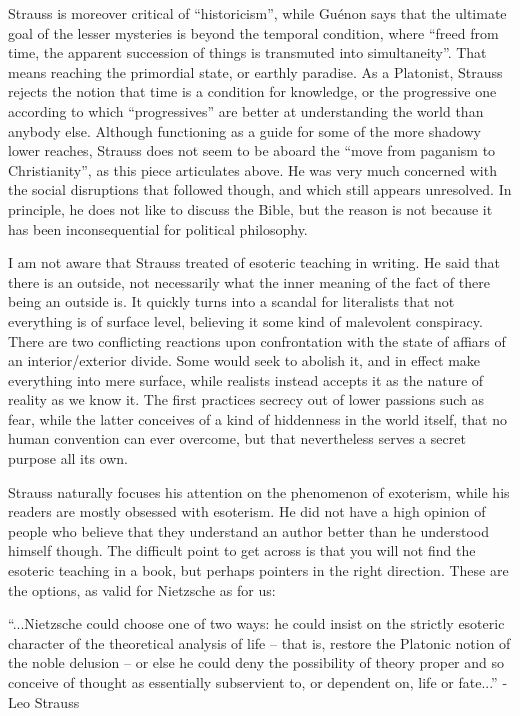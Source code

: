 \begin{footnotesize}
\begin{sffamily}
Strauss is moreover critical of ``historicism'', while Guénon says that the ultimate goal of the lesser mysteries is beyond the temporal condition, where ``freed from time, the apparent succession of things is transmuted into simultaneity''. That means reaching the primordial state, or earthly paradise. As a Platonist, Strauss rejects the notion that time is a condition for knowledge, or the progressive one according to which ``progressives'' are better at understanding the world than anybody else. Although functioning as a guide for some of the more shadowy lower reaches, Strauss does not seem to be aboard the ``move from paganism to Christianity'', as this piece articulates above. He was very much concerned with the social disruptions that followed though, and which still appears unresolved. In principle, he does not like to discuss the Bible, but the reason is not because it has been inconsequential for political philosophy.

I am not aware that Strauss treated of esoteric teaching in writing. He said that there is an outside, not necessarily what the inner meaning of the fact of there being an outside is. It quickly turns into a scandal for literalists that not everything is of surface level, believing it some kind of malevolent conspiracy. There are two conflicting reactions upon confrontation with the state of affiars of an interior/exterior divide. Some would seek to abolish it, and in effect make everything into mere surface, while realists instead accepts it as the nature of reality as we know it. The first practices secrecy out of lower passions such as fear, while the latter conceives of a kind of hiddenness in the world itself, that no human convention can ever overcome, but that nevertheless serves a secret purpose all its own.

Strauss naturally focuses his attention on the phenomenon of exoterism, while his readers are mostly obsessed with esoterism. He did not have a high opinion of people who believe that they understand an author better than he understood himself though. The difficult point to get across is that you will not find the esoteric teaching in a book, but perhaps pointers in the right direction. These are the options, as valid for Nietzsche as for us:

``...Nietzsche could choose one of two ways: he could insist on the strictly esoteric character of the theoretical analysis of life -- that is, restore the Platonic notion of the noble delusion -- or else he could deny the possibility of theory proper and so conceive of thought as essentially subservient to, or dependent on, life or fate...'' -Leo Strauss


\end{sffamily}
\end{footnotesize}
